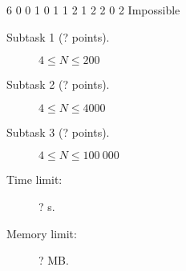 \documentclass{boi2014-lt}
\begin{document}
	\example
	{
		6
		0 0
		1 0
		1 1
		2 1
		2 2
		0 2
	}
	{
		Impossible
	}

    \Scoring

    \begin{description}
        \item[Subtask 1 (? points).] $4 \le N \le 200$
        \item[Subtask 2 (? points).] $4 \le N \le 4000$
        \item[Subtask 3 (? points).] $4 \le N \le 100\ 000$
    \end{description}

    \Constraints

    \begin{description}
        \item[Time limit:] ? s.
        \item[Memory limit:] ? MB.
    \end{description}
\end{document}
